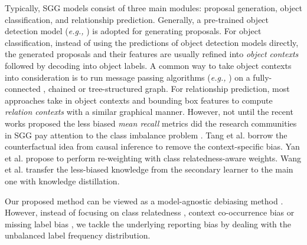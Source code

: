 \documentclass[sigconf]{acmart}
\begin{document}
Typically, SGG models consist of three main modules: proposal generation, object classification, and relationship prediction.
Generally, a pre-trained object detection model (\emph{e.g.,} \cite{ren2015faster}) is adopted for generating proposals.
For object classification, instead of using the predictions of object detection models directly, the generated proposals and their features are usually refined into \textit{object contexts} \cite{xu2017scene,yang2018graph,zellers2018neural,chen2019knowledge,tang2019learning} followed by decoding into object labels.
A common way to take object contexts into consideration is to run message passing algorithms (\emph{e.g.,} \cite{hochreiter1997long,tai-etal-2015-improved,li2015gated}) on a fully-connected \cite{xu2017scene,yang2018graph,chen2019knowledge}, chained \cite{zellers2018neural} or tree-structured \cite{tang2019learning} graph.
For relationship prediction, most approaches \cite{zellers2018neural,tang2020unbiased,chen2019knowledge} take in object contexts and bounding box features to compute \textit{relation contexts} with a similar graphical manner.
However, not until the recent works \cite{tang2019learning,chen2019knowledge} proposed the less biased \textit{mean recall} metrics did the research communities in SGG pay attention to the class imbalance problem \cite{gu2019scene,dornadula2019visual,Lin_2020_CVPR,tang2020unbiased,yan2020pcpl,DBLP:conf/bmvc/WangPL20}.
Tang et al. \cite{tang2020unbiased} borrow the counterfactual idea from causal inference to remove the context-specific bias.
Yan et al. \cite{yan2020pcpl} propose to perform re-weighting with class relatedness-aware weights.
Wang et al. \cite{DBLP:conf/bmvc/WangPL20} transfer the less-biased knowledge from the secondary learner to the main one with knowledge distillation.

Our proposed method can be viewed as a model-agnostic debiasing method \cite{tang2020unbiased,yan2020pcpl,DBLP:conf/bmvc/WangPL20}.
However, instead of focusing on 
class relatedness \cite{yan2020pcpl},
context co-occurrence bias \cite{tang2020unbiased} 
or missing label bias \cite{DBLP:conf/bmvc/WangPL20},
we tackle the underlying reporting bias \cite{misra2016seeing} by dealing with the unbalanced label frequency distribution.
\end{document}
